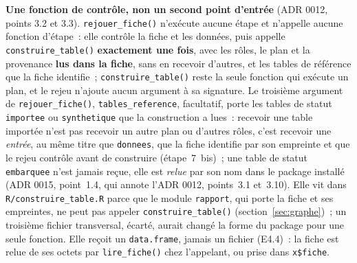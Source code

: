 \documentclass[a4paper,11pt]{article}
\newcommand{\code}[1]{\texttt{\small #1}}
\begin{document}
\medskip
\noindent
\textbf{Une fonction de contrôle, non un second point d'entrée} (ADR 0012,
points 3.2 et 3.3). \code{rejouer\_fiche()} n'exécute aucune étape et
n'appelle aucune fonction d'étape~: elle contrôle la fiche et les données,
puis appelle \code{construire\_table()} \textbf{exactement une fois}, avec
les rôles, le plan et la provenance \textbf{lus dans la fiche}, sans en
recevoir d'autres, et les tables de référence que la fiche identifie~;
\code{construire\_table()} reste la seule fonction qui exécute un plan, et
le rejeu n'ajoute aucun argument à sa signature. Le troisième argument de
\code{rejouer\_fiche()}, \code{tables\_reference}, facultatif, porte les
tables de statut \code{importee} ou \code{synthetique} que la construction
a lues~: recevoir une table importée n'est pas recevoir un autre plan ou
d'autres rôles, c'est recevoir une \emph{entrée}, au même titre que
\code{donnees}, que la fiche identifie par son empreinte et que le rejeu
contrôle avant de construire (étape~7~bis)~; une table de statut
\code{embarquee} n'est jamais reçue, elle est \emph{relue} par son nom dans
le package installé (ADR 0015, point~1.4, qui annote l'ADR 0012, points~3.1
et~3.10). Elle vit dans
\code{R/construire\_table.R} parce que le module \code{rapport}, qui porte la
fiche et ses empreintes, ne peut pas appeler \code{construire\_table()}
(section~\ref{sec:graphe})~; un troisième fichier transversal, écarté,
aurait changé la forme du package pour une seule fonction. Elle reçoit un
\code{data.frame}, jamais un fichier (E4.4)~: la fiche est relue de ses
octets par \code{lire\_fiche()} chez l'appelant, ou prise dans
\code{x\$fiche}.
\end{document}

